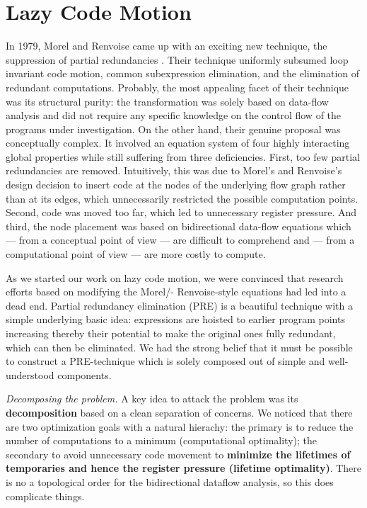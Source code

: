 \newpage


\section{Lazy Code Motion}

In 1979, Morel and Renvoise came up with an exciting new technique,
the suppression of partial redundancies \cite{morel1979global}. Their technique
uniformly subsumed loop invariant code motion, common
subexpression elimination, and the elimination of redundant
computations. Probably, the most appealing facet of their
technique was its structural purity: the transformation was
solely based on data-flow analysis and did not require any
specific knowledge on the control flow of the programs under investigation. On the other hand, their genuine proposal
was conceptually complex. It involved an equation system
of four highly interacting global properties while still suffering from three deficiencies. First, too few partial redundancies are removed. Intuitively, this was due to Morel’s and
Renvoise’s design decision to insert code at the nodes of the
underlying flow graph rather than at its edges, which unnecessarily restricted the possible computation points. Second,
code was moved too far, which led to unnecessary register
pressure. And third, the node placement was based on bidirectional data-flow equations which — from a conceptual
point of view — are difficult to comprehend and — from a
computational point of view — are more costly to compute.

As we started our work on lazy code motion, we were convinced that research efforts based on modifying the Morel/-
Renvoise-style equations had led into a dead end. Partial redundancy elimination (PRE) is a beautiful technique with
a simple underlying basic idea: expressions are hoisted to
earlier program points increasing thereby their potential to
make the original ones fully redundant, which can then be
eliminated. We had the strong belief that it must be possible to construct a PRE-technique which is solely composed
out of simple and well-understood components.

\textit{Decomposing the problem.} A key idea to attack the problem was its \textbf{decomposition} based on a clean separation of
concerns. We noticed that there are two optimization goals
with a natural hierachy: the primary is to reduce the number of computations to a minimum (computational optimality); 
the secondary to avoid unnecessary code movement to
\textbf{minimize the lifetimes of temporaries and hence the register
pressure (lifetime optimality)}. There is no a topological order for the bidirectional dataflow analysis, so this does complicate things.

